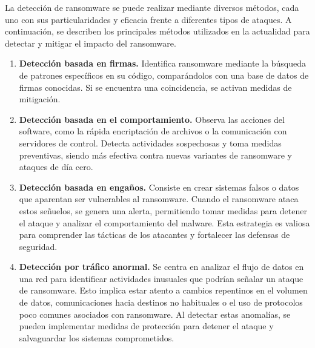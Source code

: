 La detección de ransomware se puede realizar mediante diversos métodos, cada uno con sus particularidades y eficacia frente a diferentes tipos de ataques. A continuación, se describen los principales métodos utilizados en la actualidad para detectar y mitigar el impacto del ransomware.

\begin{enumerate}
  \item \textbf{Detección basada en firmas.} Identifica ransomware mediante la búsqueda de patrones específicos en su código, comparándolos con una base de datos de firmas conocidas. Si se encuentra una coincidencia, se activan medidas de mitigación\autocite{pastorino}.
  
  \item \textbf{Detección basada en el comportamiento.} Observa las acciones del software, como la rápida encriptación de archivos o la comunicación con servidores de control. Detecta actividades sospechosas y toma medidas preventivas, siendo más efectiva contra nuevas variantes de ransomware y ataques de día cero\autocite{fhabte2023ransomware}.
  
  \item \textbf{Detección basada en engaños.} Consiste en crear sistemas falsos o datos que aparentan ser vulnerables al ransomware. Cuando el ransomware ataca estos señuelos, se genera una alerta, permitiendo tomar medidas para detener el ataque y analizar el comportamiento del malware. Esta estrategia es valiosa para comprender las tácticas de los atacantes y fortalecer las defensas de seguridad\autocite{pedro2022cripto}.
  
  \item \textbf{Detección por tráfico anormal.} Se centra en analizar el flujo de datos en una red para identificar actividades inusuales que podrían señalar un ataque de ransomware. Esto implica estar atento a cambios repentinos en el volumen de datos, comunicaciones hacia destinos no habituales o el uso de protocolos poco comunes asociados con ransomware. Al detectar estas anomalías, se pueden implementar medidas de protección para detener el ataque y salvaguardar los sistemas comprometidos\autocite{fhabte2023ransomware}.
\end{enumerate}

